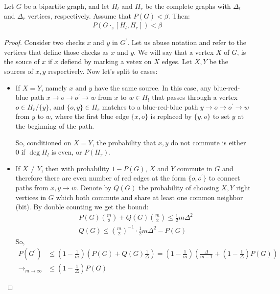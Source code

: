 \documentclass[manuscript,screen,review]{acmart}
\begin{document}
\begin{claim}  
Let $G$ be a bipartite graph, and let $H_{l}$ and $H_{r}$ be the complete graphs with $\Delta_{l}$ and $\Delta_{r}$ vertices, respectively. Assume that $P(G) < \beta$. Then:
\begin{equation*}
  \begin{split}
      P(G \cdot_{z} [H_{l},H_{r}]) < \beta
  \end{split}
\end{equation*}
\end{claim}
\begin{proof}
  Consider two checks $x$ and $y$ in $G^{\prime}$. Let us abuse notation and refer to the vertices that define those checks as $x$ and $y$. We will say that a vertex $X$ of $G$, is the souce of $x$ if $x$ defiend by marking a vetex on $X$ edges. Let $X,Y$ be the sources of $x,y$ respectively. Now let's split to cases:
  \begin{itemize}
    \item If $X = Y$, namely $x$ and $y$ have the same source. In this case, any blue-red-blue path $x \rightarrow o \rightarrow o^{\prime} \rightarrow w$ from $x$ to $w \in H_{l}$ that passes through a vertex $o \in H_{r}/\{y\}$, and $\{o,y\} \in H_{r}$ matches to a blue-red-blue path $y \rightarrow o \rightarrow o^{\prime} \rightarrow w$ from $y$ to $w$, where the first blue edge $\{ x, o \}$ is replaced by $\{ y, o \}$ to set $y$ at the beginning of the path.
   
    So, conditioned on $X=Y$, the probability that $x,y$ do not commute is either $0$ if $\deg H_{l}$ is even, or $P(H_{r})$.
  \item {} If $X\neq Y$, then with probability $1 - P(G)$, $X$ and $Y$ commute in $G$ and therefore there are even number of red edges at the form $\{o , o^{\prime}\}$ to connect paths from $x,y \rightarrow w$. Denote by $Q(G)$ the probability of choosing $X,Y$ right vertices in $G$ which both commute and share at least one common neighbor (bit).  
By double counting we get the bound: 
    \begin{equation*}
      \begin{split}
        & P(G){ m \choose 2} + Q(G){ m \choose 2} \le \frac{1}{2}m \Delta^{2} \\ 
        & Q(G) \le { m \choose 2 }^{-1}\cdot \frac{1}{2}m\Delta^{2} - P(G)
      \end{split}
    \end{equation*}
    So, 
    \begin{equation*}
      \begin{split}
        P(G^{\prime})  & \le \left( 1 - \frac{1}{m} \right) \left( P(G) + Q(G)  \frac{1}{\Delta} \right) = \left( 1 - \frac{1}{m} \right) \left(  \frac{\Delta}{m-1} + \left( 1 -  \frac{1}{\Delta}\right)P(G) \right) \\
       \rightarrow_{m \rightarrow \infty } & \le  \left(  1 - \frac{1}{\Delta} \right)P(G)
      \end{split}
    \end{equation*}

  \end{itemize}
\end{proof}
\end{document}
